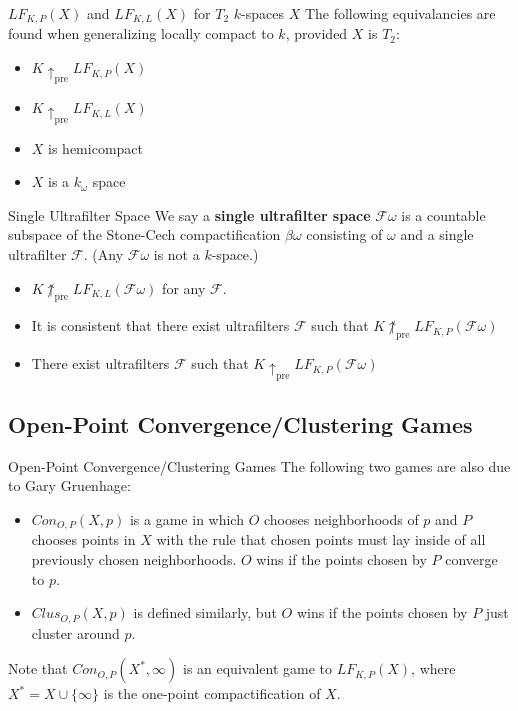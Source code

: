 \documentclass{beamer}
\newcommand{\prewin}{\uparrow_{\text{pre}}}
\newcommand{\oneptcomp}[1]{#1^*}
\newcommand{\congame}[2]{Con_{O,P}(#1,#2)}
\newcommand{\clusgame}[2]{Clus_{O,P}(#1,#2)}
\newcommand{\lfkpgame}[1]{LF_{K,P}(#1)}
\newcommand{\lfklgame}[1]{LF_{K,L}(#1)}
\newcommand{\sus}{\mathcal{F}\omega}
\newcommand{\uF}{\mathcal{F}}
\begin{document}
\begin{frame}{$\lfkpgame{X}$ and $\lfklgame{X}$ for $T_2$ $k$-spaces $X$}
The following equivalancies are found when generalizing locally compact to $k$, provided $X$ is $T_2$:
\pause
\begin{itemize}
\item $K\prewin\lfkpgame{X}$
\item $K\prewin\lfklgame{X}$
\pause
\item $X$ is hemicompact
\pause
\item $X$ is a $k_\omega$ space
\end{itemize}
\end{frame}

\begin{frame}{Single Ultrafilter Space}
We say a \textbf{single ultrafilter space} $\sus$ is a countable subspace of the Stone-Cech compactification $\beta\omega$ consisting of $\omega$ and a single ultrafilter $\uF$. (Any $\sus$ is not a $k$-space.)
\pause
\begin{itemize}
\item $K \not\prewin \lfklgame{\sus}$ for any $\uF$.
\pause
\item It is consistent that there exist ultrafilters $\uF$ such that $K \not\prewin \lfkpgame{\sus}$
\pause
\item There exist ultrafilters $\uF$ such that $K\prewin \lfkpgame{\sus}$
\end{itemize}
\end{frame}

\subsection[Open-Point Convergence/Clustering Games]{Open-Point Convergence/Clustering Games}

\begin{frame}{Open-Point Convergence/Clustering Games}
The following two games are also due to Gary Gruenhage:
\pause
\begin{itemize}
\item $\congame{X}{p}$ is a game in which $O$ chooses neighborhoods of $p$ and $P$ chooses points in $X$ with the rule that chosen points must lay inside of all previously chosen neighborhoods. $O$ wins if the points chosen by $P$ converge to $p$.
\pause
\item $\clusgame{X}{p}$ is defined similarly, but $O$ wins if the points chosen by $P$ just cluster around $p$.
\end{itemize}
\pause
Note that $\congame{\oneptcomp{X}}{\infty}$ is an equivalent game to $\lfkpgame{X}$, where $\oneptcomp{X}=X\cup\{\infty\}$ is the one-point compactification of $X$.
\end{frame}
\end{document}
